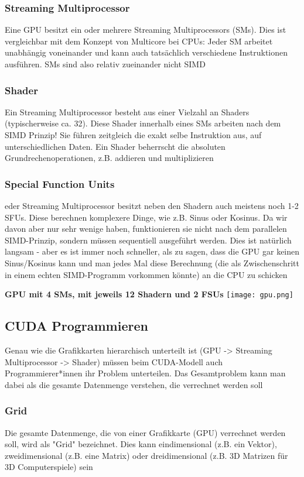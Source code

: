 		\subsubsection{Streaming Multiprocessor}
			Eine GPU besitzt ein oder mehrere Streaming Multiprocessors (SMs). Dies ist vergleichbar mit dem Konzept von Multicore bei CPUs: Jeder SM arbeitet unabhängig voneinander und kann auch tatsächlich verschiedene Instruktionen ausführen. SMs sind also relativ zueinander nicht SIMD
		\subsubsection{Shader}
			Ein Streaming Multiprocessor besteht aus einer Vielzahl an Shaders (typischerweise ca. 32). Diese Shader innerhalb eines SMs arbeiten nach dem SIMD Prinzip! Sie führen zeitgleich die exakt selbe Instruktion aus, auf unterschiedlichen Daten. Ein Shader beherrscht die absoluten Grundrechenoperationen, z.B. addieren und multiplizieren
		\subsubsection{Special Function Units}
			eder Streaming Multiprocessor besitzt neben den Shadern auch meistens noch 1-2 SFUs. Diese berechnen komplexere Dinge, wie z.B. Sinus oder Kosinus. Da wir davon aber nur sehr wenige haben, funktionieren sie nicht nach dem parallelen SIMD-Prinzip, sondern müssen sequentiell ausgeführt werden. Dies ist natürlich langsam - aber es ist immer noch schneller, als zu sagen, dass die GPU gar keinen Sinus/Kosinus kann und man jedes Mal diese Berechnung (die als Zwischenschritt in einem echten SIMD-Programm vorkommen könnte) an die CPU zu schicken \newline \newline
		\begin{center}
			\textbf{GPU mit 4 SMs, mit jeweils 12 Shadern und 2 FSUs} \newline
			\texttt{[image: gpu.png]}
		\end{center}
	\subsection{CUDA Programmieren}
		Genau wie die Grafikkarten hierarchisch unterteilt ist (GPU -> Streaming Multiprocessor -> Shader) müssen beim CUDA-Modell auch Programmierer*innen ihr Problem unterteilen. Das Gesamtproblem kann man dabei als die gesamte Datenmenge verstehen, die verrechnet werden soll
		\subsubsection{Grid}
			Die gesamte Datenmenge, die von einer Grafikkarte (GPU) verrechnet werden soll, wird als "Grid" bezeichnet. Dies kann eindimensional (z.B. ein Vektor), zweidimensional (z.B. eine Matrix) oder dreidimensional (z.B. 3D Matrizen für 3D Computerspiele) sein
